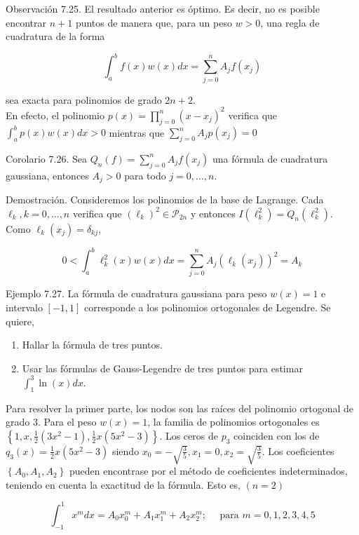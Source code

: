 \documentclass[10pt]{article}
\begin{document}
Observación 7.25. El resultado anterior es óptimo. Es decir, no es posible encontrar $n+1$ puntos de manera que, para un peso $w>0$, una regla de cuadratura de la forma

$$
\int_{a}^{b} f(x) w(x) d x=\sum_{j=0}^{n} A_{j} f\left(x_{j}\right)
$$

sea exacta para polinomios de grado $2 n+2$.\\
En efecto, el polinomio $p(x)=\prod_{j=0}^{n}\left(x-x_{j}\right)^{2}$ verifica que $\int_{a}^{b} p(x) w(x) d x>0$ mientras que $\sum_{j=0}^{n} A_{j} p\left(x_{j}\right)=0$

Corolario 7.26. Sea $Q_{n}(f)=\sum_{j=0}^{n} A_{j} f\left(x_{j}\right)$ una fórmula de cuadratura gaussiana, entonces $A_{j}>0$ para todo $j=0, \ldots, n$.

Demostración. Consideremos los polinomios de la base de Lagrange. Cada $\ell_{k}, k=0, \ldots, n$ verifica que $\left(\ell_{k}\right)^{2} \in \mathcal{P}_{2 n}$ y entonces $I\left(\ell_{k}^{2}\right)=Q_{n}\left(\ell_{k}^{2}\right)$. Como $\ell_{k}\left(x_{j}\right)=\delta_{k j}$,

$$
0<\int_{a}^{b} \ell_{k}^{2}(x) w(x) d x=\sum_{j=0}^{n} A_{j}\left(\ell_{k}\left(x_{j}\right)\right)^{2}=A_{k}
$$

Ejemplo 7.27. La fórmula de cuadratura gaussiana para peso $w(x)=1$ e intervalo $[-1,1]$ corresponde a los polinomios ortogonales de Legendre. Se quiere,

\begin{enumerate}
  \item Hallar la fórmula de tres puntos.
  \item Usar las fórmulas de Gauss-Legendre de tres puntos para estimar $\int_{1}^{3} \ln (x) d x$.
\end{enumerate}

Para resolver la primer parte, los nodos son las raíces del polinomio ortogonal de grado 3. Para el peso $w(x)=1$, la familia de polinomios ortogonales es $\left\{1, x, \frac{1}{2}\left(3 x^{2}-1\right), \frac{1}{2} x\left(5 x^{2}-3\right)\right\}$. Los ceros de $p_{3}$ coinciden con los de $q_{3}(x)=\frac{1}{2} x\left(5 x^{2}-3\right)$ siendo $x_{0}=-\sqrt{\frac{3}{5}}, x_{1}=0, x_{2}=\sqrt{\frac{3}{5}}$. Los coeficientes $\left\{A_{0}, A_{1}, A_{2}\right\}$ pueden encontrase por el método de coeficientes indeterminados, teniendo en cuenta la exactitud de la fórmula. Esto es, $(n=2)$

$$
\int_{-1}^{1} x^{m} d x=A_{0} x_{0}^{m}+A_{1} x_{1}^{m}+A_{2} x_{2}^{m} ; \quad \text { para } m=0,1,2,3,4,5
$$
\end{document}
